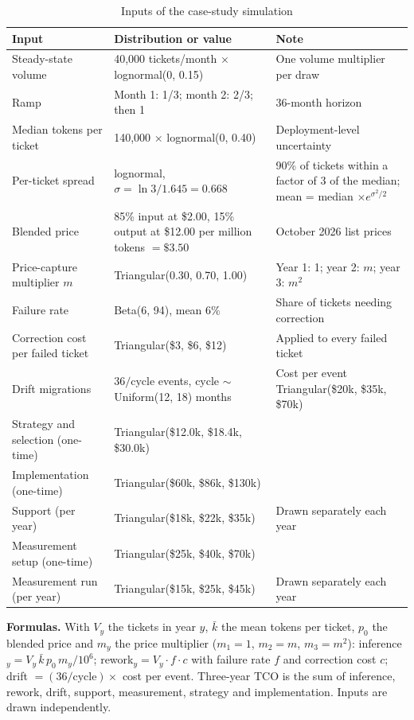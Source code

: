 \documentclass[10pt]{article}
\begin{document}
\begin{table}[h]
\caption{Inputs of the case-study simulation}\label{tab:params}
\centering\small
\begin{tabular}{p{4.6cm}p{5.2cm}p{5.4cm}}
\toprule
Input & Distribution or value & Note \\
\midrule
Steady-state volume & 40{,}000 tickets/month $\times$ lognormal(0, 0.15) & One volume multiplier per draw \\
Ramp & Month 1: 1/3; month 2: 2/3; then 1 & 36-month horizon \\
Median tokens per ticket & 140{,}000 $\times$ lognormal(0, 0.40) & Deployment-level uncertainty \\
Per-ticket spread & lognormal, $\sigma=\ln 3/1.645=0.668$ & 90\% of tickets within a factor of 3 of the median; mean = median $\times e^{\sigma^2/2}$ \\
Blended price & 85\% input at \$2.00, 15\% output at \$12.00 per million tokens $=\$3.50$ & October 2026 list prices \\
Price-capture multiplier $m$ & Triangular(0.30, 0.70, 1.00) & Year 1: 1; year 2: $m$; year 3: $m^2$ \\
Failure rate & Beta(6, 94), mean 6\% & Share of tickets needing correction \\
Correction cost per failed ticket & Triangular(\$3, \$6, \$12) & Applied to every failed ticket \\
Drift migrations & $36/\mathrm{cycle}$ events, cycle $\sim$ Uniform(12, 18) months & Cost per event Triangular(\$20k, \$35k, \$70k) \\
Strategy and selection (one-time) & Triangular(\$12.0k, \$18.4k, \$30.0k) & \\
Implementation (one-time) & Triangular(\$60k, \$86k, \$130k) & \\
Support (per year) & Triangular(\$18k, \$22k, \$35k) & Drawn separately each year \\
Measurement setup (one-time) & Triangular(\$25k, \$40k, \$70k) & \\
Measurement run (per year) & Triangular(\$15k, \$25k, \$45k) & Drawn separately each year \\
\bottomrule
\end{tabular}
\end{table}

\textbf{Formulas.} With $V_y$ the tickets in year $y$, $\bar{k}$ the mean tokens per ticket, $p_0$ the blended price and $m_y$ the price multiplier ($m_1=1$, $m_2=m$, $m_3=m^2$): inference$_y=V_y\,\bar{k}\,p_0\,m_y/10^6$; rework$_y=V_y\cdot f\cdot c$ with failure rate $f$ and correction cost $c$; drift $=(36/\mathrm{cycle})\times$ cost per event. Three-year TCO is the sum of inference, rework, drift, support, measurement, strategy and implementation. Inputs are drawn independently.
\end{document}
